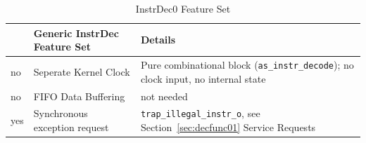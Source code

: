 \begin{table}[H]
\caption{InstrDec0 Feature Set}
\label{tab:asCoreInstrDec01}
\centering
\begin{tabularx}{\textwidth}{|l |l |X|}
  \hline
   & Generic InstrDec Feature Set & Details \\
  \hline
  \hline
  no & Seperate Kernel Clock & Pure combinational block (\texttt{as\_instr\_decode}); no clock input, no internal state \\
  \hline
  no & FIFO Data Buffering & not needed \\
  \hline
  yes & Synchronous exception request & \texttt{trap\_illegal\_instr\_o}, see Section~\ref{sec:decfunc01} Service Requests \\
  \hline
\end{tabularx}
\end{table}
